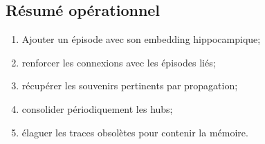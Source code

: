 \documentclass[12pt,a4paper]{article}
\begin{document}
\subsection{Résumé opérationnel}
\begin{enumerate}[leftmargin=*]
    \item Ajouter un épisode avec son embedding hippocampique;
    \item renforcer les connexions avec les épisodes liés;
    \item récupérer les souvenirs pertinents par propagation;
    \item consolider périodiquement les hubs;
    \item élaguer les traces obsolètes pour contenir la mémoire.
\end{enumerate}
\end{document}
